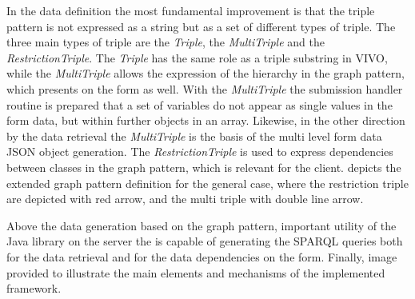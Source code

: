 In the data definition the most fundamental improvement is that the triple pattern is not expressed as a string but as a set of different types of triple. The three main types of triple are the \textit{Triple}, the \textit{MultiTriple} and the \textit{RestrictionTriple}. The \textit{Triple} has the same role as a triple substring in VIVO, while the \textit{MultiTriple} allows the expression of the hierarchy in the graph pattern, which presents on the form as well. With the \textit{MultiTriple} the submission handler routine is prepared that a set of variables do not appear as single values in the form data, but within further objects in an array. Likewise, in the other direction by the data retrieval the \textit{MultiTriple} is the basis of the multi level form data JSON object generation. The \textit{RestrictionTriple} is used to express dependencies between classes in the graph pattern, which is relevant for the client.  depicts the extended graph pattern definition for the general case, where the restriction triple are depicted with red arrow, and the multi triple with double line arrow.


Above the data generation based on the graph pattern, important utility of the Java library on the server the is capable of generating the SPARQL queries both for the data retrieval and for the data dependencies on the form. Finally, image provided to illustrate the main elements and mechanisms of the implemented framework.

